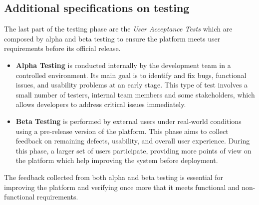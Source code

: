 \subsection{Additional specifications on testing}
The last part of the testing phase are the \textit{User Acceptance Tests} which are composed by alpha and beta testing to ensure the platform meets user requirements before its official release.
\begin{itemize}
\item \textbf{Alpha Testing} is conducted internally by the development team in a controlled environment. Its main goal is to identify and fix bugs, functional issues, and usability problems at an early stage. This type of test involves a small number of testers, internal team members and some stakeholders, which allows developers to address critical issues immediately.
\item \textbf{Beta Testing} is performed by external users under real-world conditions using a pre-release version of the platform. This phase aims to collect feedback on remaining defects, usability, and overall user experience. During this phase, a larger set of users participate, providing more points of view on the platform which help improving the system before deployment.
\end{itemize}
The feedback collected from both alpha and beta testing is essential for improving the platform and verifying once more that it meets functional and non-functional requirements.